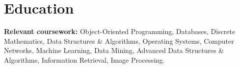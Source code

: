 \section{Education}

\vspace{1pt}
{\small\color{ink}\textbf{Relevant coursework:} Object-Oriented Programming, Databases, Discrete Mathematics, Data Structures \& Algorithms, Operating Systems, Computer Networks, Machine Learning, Data Mining, Advanced Data Structures \& Algorithms, Information Retrieval, Image Processing.}
